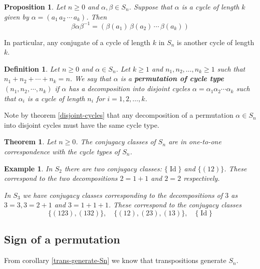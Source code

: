 \documentclass[12pt]{article}
\numberwithin{equation}{subsection}
\newtheorem{thm}[subsection]{Theorem}
\newtheorem{prop}[subsection]{Proposition}
\newtheorem{defn}[subsection]{Definition}
\theoremstyle{note}
\newtheorem{example}[subsection]{Example}
\newcommand{\Id}{\operatorname{Id}}
\begin{document}
\begin{prop} Let $n\geq 0$ and $\alpha,\beta\in S_n$. Suppose that $\alpha$ is a cycle of length $k$ given by $\alpha=(a_1 \, a_2\, \cdots \, a_k)$. Then \[\beta\alpha\beta^{-1}=(\beta(a_1) \, \beta(a_2)\, \cdots \, \beta(a_k))\]

\end{prop}
In particular, any conjugate of a cycle of length $k$ in $S_n$ is another cycle of length $k$. 


\begin{defn}
Let $n\geq 0$ and $\alpha\in S_n$. Let $k\geq 1$ and $n_1,n_2,\dots,n_k\geq 1$ such that $n_1+n_2+\cdots+n_k=n$. We say that $\alpha$ is a \textbf{permutation of cycle type $(n_1,n_2,\cdots,n_k)$} if $\alpha$ has a decomposition into disjoint cycles $\alpha=\alpha_1\alpha_2\cdots\alpha_k$ such that $\alpha_i$ is a cycle of length $n_i$ for $i=1,2,\dots,k$. 
\end{defn}

Note by theorem \ref{disjoint-cycles} that any decomposition of a permutation $\alpha\in S_n$ into disjoint cycles must have the same cycle type. 


\begin{thm}
	Let $n\geq 0$. The conjugacy classes of $S_n$ are in one-to-one correspondence with the cycle types of $S_n$. 
\end{thm}

\begin{example}
	In $S_2$ there are two conjugacy classes: $\{\Id\}$ and $\{(12)\}$. These correspond to the two decompositions $2=1+1$ and $2=2$ respectively.
	
	In $S_3$ we have conjugacy classes corresponding to the decompositions of $3$ as $3=3, 3=2+1$ and $3=1+1+1$. These correspond to the conjugacy classes \[ \{ (123), (132) \}, \quad \{ (12), (23), (13)\}, \quad \{ \Id\}\]
	
\end{example}



\subsection{Sign of a permutation}

From corollary \ref{trans-generate-Sn} we know that transpositions generate $S_n$. 
\end{document}
